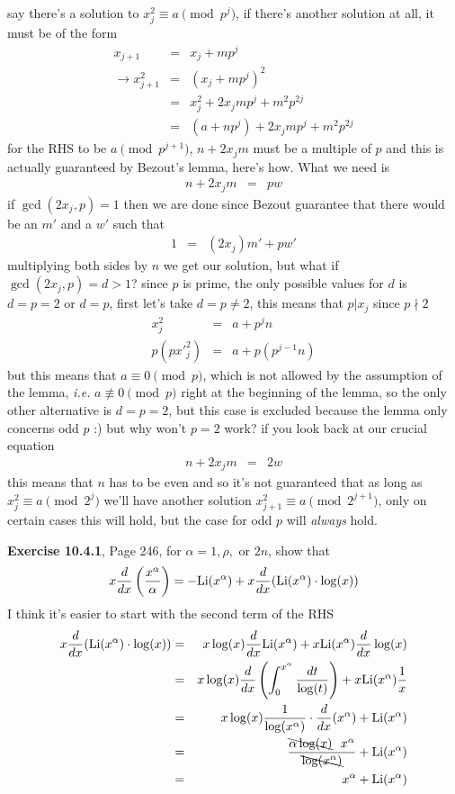 \documentclass[aps,preprint,preprintnumbers,nofootinbib,showpacs,prd]{revtex4-1}
\newcommand{\ie}{{\it i.e.} }
\newcommand{\nbea}{\begin{eqnarray*}}
\newcommand{\neea}{\end{eqnarray*}}
\begin{document}
say there's a solution to $x_j^2 \equiv a \pmod{p^j}$, if there's another solution at all, it must be of the form
%
\nbea
x_{j+1} & = & x_j + mp^j \\
\to x_{j+1}^2 & = & (x_j + mp^j)^2 \\
& = & x^2_j + 2x_jmp^j + m^2p^{2j} \\
& = & (a + np^j) + 2x_jmp^j + m^2p^{2j}
\neea
%
for the RHS to be $a \pmod{p^{j+1}}$, $n+ 2x_jm$ must be a multiple of $p$ and this is actually guaranteed by Bezout's lemma, here's how. What we need is
%
\nbea
n+ 2x_jm & = & pw
\neea
%
if $\gcd(2x_j,p)=1$ then we are done since Bezout guarantee that there would be an $m'$ and a $w'$ such that
%
\nbea
1 & = & (2x_j)m' + pw'
\neea
%
multiplying both sides by $n$ we get our solution, but what if $\gcd(2x_j,p) = d > 1$? since $p$ is prime, the only possible values for $d$ is $d=p=2$ or $d = p$, first let's take $d = p \neq 2$, this means that $p|x_j$ since $p\nmid 2$
%
\nbea
x_j^2 & = & a +p^jn \\
p(p{x'}_j^2) & = & a +p(p^{j-1}n)
\neea
%
but this means that $a \equiv 0 \pmod{p}$, which is not allowed by the assumption of the lemma, \ie $a \not\equiv 0 \pmod{p}$ right at the beginning of the lemma, so the only other alternative is $d = p = 2$, but this case is excluded because the lemma only concerns odd $p$ :) but why won't $p=2$ work? if you look back at our crucial equation
%
\nbea
n+ 2x_jm & = & 2w
\neea
%
this means that $n$ has to be even and so it's not guaranteed that as long as $x_j^2 \equiv a \pmod{2^j}$ we'll have another solution $x_{j+1}^2 \equiv a \pmod{2^{j+1}}$, only on certain cases this will hold, but the case for odd $p$ will {\it always} hold.














{\bf Exercise 10.4.1}, Page 246, for $\alpha=1, \rho,$ or $2n$, show that
%
\nbea
x\frac{d}{dx}\left(\frac{x^\alpha}{\alpha}\right) = -{\rm Li}(x^\alpha) +x\frac{d}{dx} ({\rm Li}(x^\alpha)\cdot\log(x))
\neea
%
I think it's easier to start with the second term of the RHS
%
\nbea
x\frac{d}{dx} ({\rm Li}(x^\alpha)\cdot\log(x)) & = & x \log(x) \frac{d}{dx} {\rm Li}(x^\alpha) + x{\rm Li}(x^\alpha)\frac{d}{dx} \log(x) \\
& = & x\log(x)\frac{d}{dx}\left(\int_0^{x^\alpha}\frac{dt}{\log(t)}\right) + x{\rm Li}(x^\alpha)\frac{1}{x} \\
& = & x\log(x) \frac{1}{\log(x^\alpha)}\cdot\frac{d}{dx}(x^\alpha) + {\rm Li}(x^\alpha) \\
& = & \frac{\bcancel{\alpha \log(x)}~~ x^\alpha}{\bcancel{\log(x^\alpha)}} + {\rm Li}(x^\alpha) \\
& = & x^\alpha + {\rm Li}(x^\alpha)
\neea
%
\end{document}
